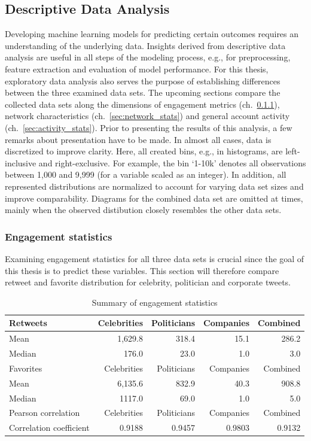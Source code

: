 \subsection{Descriptive Data Analysis}
\label{sec:dda}

Developing machine learning models for predicting certain outcomes requires
an understanding of the underlying data.
Insights derived from descriptive data analysis are useful in all steps of the
modeling process, e.g., for preprocessing, feature extraction and evaluation
of model performance.
For this thesis, exploratory data analysis also serves the purpose of establishing
differences between the three examined data sets.
The upcoming sections compare the collected data sets along the dimensions of
engagement metrics (ch.~\ref{sec:engagement_stats}), network characteristics
(ch.~\ref{sec:network_stats}) and general account activity (ch.~\ref{sec:activity_stats}).
Prior to presenting the results of this analysis, a few remarks about presentation
have to be made.
In almost all cases, data is discretized to improve clarity.
Here, all created bins, e.g., in histograms, are left-inclusive and right-exclusive.
For example, the bin `1-10k' denotes all observations between 1,000 and
9,999 (for a variable scaled as an integer).
In addition, all represented distributions are normalized to account for varying
data set sizes and improve comparability.
Diagrams for the combined data set are omitted at times, mainly when the observed
distibution closely resembles the other data sets.

\subsubsection{Engagement statistics}
\label{sec:engagement_stats}

Examining engagement statistics for all three data sets is crucial since the goal
of this thesis is to predict these variables.
This section will therefore compare retweet and favorite distribution for 
celebrity, politician and corporate tweets.

\begin{table}[h]
\begin{tabular}{lrrrr}
\toprule
  Retweets & Celebrities & Politicians & Companies & Combined\\
\midrule
  Mean & 1,629.8 & 318.4 & 15.1 & 286.2\\
  Median & 176.0 & 23.0 & 1.0 & 3.0 \\
\midrule
  Favorites & Celebrities & Politicians & Companies & Combined\\
\midrule
  Mean & 6,135.6 & 832.9 & 40.3 & 908.8 \\
  Median & 1117.0 & 69.0 & 1.0 & 5.0 \\
\midrule
  Pearson correlation & Celebrities & Politicians & Companies & Combined\\
\midrule
  Correlation coefficient & 0.9188 & 0.9457 & 0.9803 & 0.9132\\
\bottomrule
\end{tabular}
\caption{Summary of engagement statistics}
\label{tab:engagement_summary}
\end{table}

